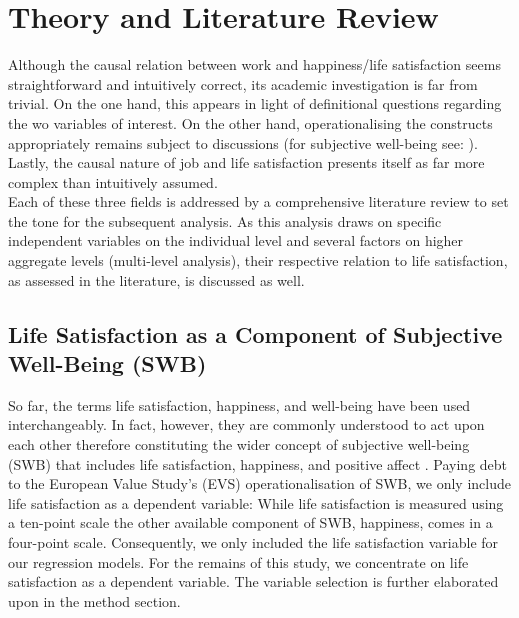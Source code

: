 \documentclass[preprint,12pt,authoryear]{elsarticle}
\begin{document}
\section{Theory and Literature Review}
Although the causal relation between work and happiness/life satisfaction seems straightforward and intuitively correct,
its academic investigation is far from trivial. On the one hand, this appears in light of definitional questions regarding the 
wo variables of interest. On the other hand, operationalising the constructs appropriately remains subject to discussions
(for subjective well-being see: \cite{kahneman_developments_2006,layard_measuring_2010}). Lastly, the causal nature of job and life
satisfaction presents itself as far more complex than intuitively assumed. \\
Each of these three fields is addressed by a comprehensive literature review to set the tone for the subsequent analysis.
As this analysis draws on specific independent variables on the individual level and several factors on higher aggregate
levels (multi-level analysis), their respective relation to life satisfaction, as assessed in the literature, is discussed as well.

\subsection{Life Satisfaction as a Component of Subjective Well-Being (SWB)}
So far, the terms life satisfaction, happiness, and well-being have been used interchangeably. In fact, however, they
are commonly understood to act upon each other therefore constituting the wider concept of subjective well-being (SWB)
that includes life satisfaction, happiness, and positive affect  \citep{bowling_meta-analytic_2010,diener_subjective_1984}. 
Paying debt to the European Value Study’s (EVS) operationalisation of SWB, we only include life satisfaction as a
dependent variable: While life satisfaction is measured using a ten-point scale the other available component of SWB,
happiness, comes in a four-point scale. Consequently, we only included the life satisfaction variable for our regression
models. For the remains of this study, we concentrate on life satisfaction as a dependent variable. The variable selection
is further elaborated upon in the method section. 
\end{document}

